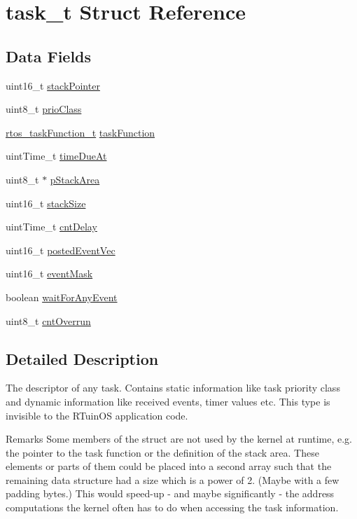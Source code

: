\hypertarget{structtask__t}{\section{task\-\_\-t Struct Reference}
\label{structtask__t}
}
\subsection*{Data Fields}
\begin{DoxyCompactItemize}
\item 
uint16\-\_\-t \hyperlink{structtask__t_a760a32c332e502fe421256fce4f7d9d8}{stack\-Pointer}
\item 
uint8\-\_\-t \hyperlink{structtask__t_a5f71b4873dad334e5ec93aec6cea1d23}{prio\-Class}
\item 
\hyperlink{rtos_8h_a3e12c5d9135209b870ca71628179beb3}{rtos\-\_\-task\-Function\-\_\-t} \hyperlink{structtask__t_a4ab0b83e3ec3a3b0d61919a926ee3d26}{task\-Function}
\item 
uint\-Time\-\_\-t \hyperlink{structtask__t_a18d0bc5a3a13ceef1c9036d56efe280d}{time\-Due\-At}
\item 
uint8\-\_\-t $\ast$ \hyperlink{structtask__t_a5edd85b979fc31ec0b53347a0e67429c}{p\-Stack\-Area}
\item 
uint16\-\_\-t \hyperlink{structtask__t_ad1781e9cc344b34a0ba6f6a896c6ed93}{stack\-Size}
\item 
uint\-Time\-\_\-t \hyperlink{structtask__t_ab3c3ac52ea96b6ed2478df36a9b1906f}{cnt\-Delay}
\item 
uint16\-\_\-t \hyperlink{structtask__t_aaf032c29bc60c586e9a33d91b21f6fa4}{posted\-Event\-Vec}
\item 
uint16\-\_\-t \hyperlink{structtask__t_ab1e84a1442746b4c7816fd15fff75baf}{event\-Mask}
\item 
boolean \hyperlink{structtask__t_a40beda2a55d5826268c79600bcce72a1}{wait\-For\-Any\-Event}
\item 
uint8\-\_\-t \hyperlink{structtask__t_ad116bccdc9e4c60355b6200a862db78a}{cnt\-Overrun}
\end{DoxyCompactItemize}


\subsection{Detailed Description}
The descriptor of any task. Contains static information like task priority class and dynamic information like received events, timer values etc. This type is invisible to the R\-Tuin\-O\-S application code. \begin{DoxyRemark}{Remarks}
Some members of the struct are not used by the kernel at runtime, e.\-g. the pointer to the task function or the definition of the stack area. These elements or parts of them could be placed into a second array such that the remaining data structure had a size which is a power of 2. (Maybe with a few padding bytes.) This would speed-\/up -\/ and maybe significantly -\/ the address computations the kernel often has to do when accessing the task information. 
\end{DoxyRemark}


